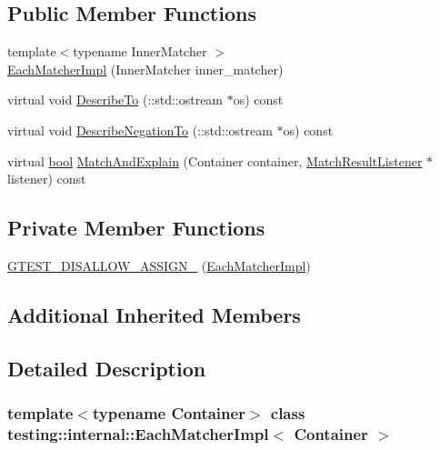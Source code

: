 \subsection*{Public Member Functions}
\begin{DoxyCompactItemize}
\item 
{\footnotesize template$<$typename Inner\+Matcher $>$ }\\\hyperlink{classtesting_1_1internal_1_1EachMatcherImpl_afe41214bf055abcdd60e475f207c7a0f}{Each\+Matcher\+Impl} (Inner\+Matcher inner\+\_\+matcher)
\item 
virtual void \hyperlink{classtesting_1_1internal_1_1EachMatcherImpl_a605e1c800c74701a773205ec050cd574}{Describe\+To} (\+::std\+::ostream $\ast$os) const
\item 
virtual void \hyperlink{classtesting_1_1internal_1_1EachMatcherImpl_a5be5bbd61f7a350fcbe30deea4c2a0c6}{Describe\+Negation\+To} (\+::std\+::ostream $\ast$os) const
\item 
virtual \hyperlink{classbool}{bool} \hyperlink{classtesting_1_1internal_1_1EachMatcherImpl_a3b8ca89c85a96bbbcc74196ad29bf1ec}{Match\+And\+Explain} (Container container, \hyperlink{classtesting_1_1MatchResultListener}{Match\+Result\+Listener} $\ast$listener) const
\end{DoxyCompactItemize}
\subsection*{Private Member Functions}
\begin{DoxyCompactItemize}
\item 
\hyperlink{classtesting_1_1internal_1_1EachMatcherImpl_abe4c447c5d68677fba97c9e9a3740367}{G\+T\+E\+S\+T\+\_\+\+D\+I\+S\+A\+L\+L\+O\+W\+\_\+\+A\+S\+S\+I\+G\+N\+\_\+} (\hyperlink{classtesting_1_1internal_1_1EachMatcherImpl}{Each\+Matcher\+Impl})
\end{DoxyCompactItemize}
\subsection*{Additional Inherited Members}


\subsection{Detailed Description}
\subsubsection*{template$<$typename Container$>$\newline
class testing\+::internal\+::\+Each\+Matcher\+Impl$<$ Container $>$}



